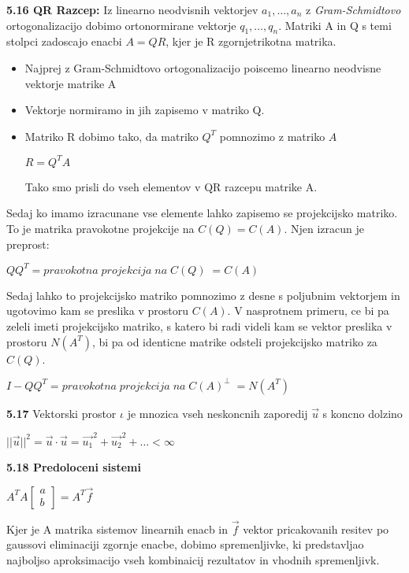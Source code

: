 \documentclass{article}
\begin{document}
\begin{multicols}{4}
	\textbf{5.16 QR Razcep:} Iz linearno neodvisnih vektorjev $a_{1}, \dots, a_{n}$ z \textit{Gram-Schmidtovo} ortogonalizacijo
	dobimo ortonormirane vektorje $q_{1}, \dots, q_{n}$. Matriki A in Q s temi stolpci zadoscajo enacbi $A = QR$, kjer
	je R zgornjetrikotna matrika.
	\begin{itemize}
		\item Najprej z Gram-Schmidtovo ortogonalizacijo poiscemo linearno neodvisne vektorje matrike A
		\item Vektorje normiramo in jih zapisemo v matriko Q.
		\item Matriko R dobimo tako, da matriko $Q^{T}$ pomnozimo z matriko $A$
		      \begin{center}
			      \begin{math}
				      R = Q^{T}A
			      \end{math}
		      \end{center}
		      Tako smo prisli do vseh elementov v QR razcepu matrike A.
	\end{itemize}
	Sedaj ko imamo izracunane vse elemente lahko zapisemo se projekcijsko matriko. To je matrika pravokotne projekcije na $C(Q) = C(A)$.
	Njen izracun je preprost:
	\begin{center}
		\begin{math}
			QQ^{T} = pravokotna\; projekcija\; na\; C(Q)\; = C(A)
		\end{math}
	\end{center}
	Sedaj lahko to projekcijsko matriko pomnozimo z desne s poljubnim vektorjem in ugotovimo kam se preslika v prostoru $C(A)$.
	V nasprotnem primeru, ce bi pa zeleli imeti projekcijsko matriko, s katero bi radi videli kam se vektor preslika v prostoru $N(A^{T})$, bi pa od identicne matrike
	odsteli projekcijsko matriko za $C(Q)$.
	\begin{center}
		\begin{math}
			I - QQ^{T} = pravokotna\; projekcija\; na\; C(A)^{\perp}\; = N(A^{T})
		\end{math}
	\end{center}

	\textbf{5.17} Vektorski prostor $\iota$ je mnozica vseh neskoncnih zaporedij $\vec{u}$ s koncno
	dolzino
	\begin{center}
		$||\vec{u}||^{2} = \vec{u} \cdot \vec{u} = \vec{u_{1}}^{2} + \vec{u_{2}}^{2} + \dots < \infty$
	\end{center}

	\textbf{5.18 Predoloceni sistemi}
	\begin{center}
		\begin{math}
			A^{T}A
			\begin{bmatrix}
				a \\
				b
			\end{bmatrix}
			= A^{T}\vec{f}
		\end{math}
	\end{center}
	Kjer je A matrika sistemov linearnih enacb in $\vec{f}$ vektor pricakovanih resitev
	po gaussovi eliminaciji zgornje enacbe, dobimo spremenljivke, ki predstavljao najboljso aproksimacijo vseh kombinaicij rezultatov in vhodnih spremenljivk.


\end{multicols}
\end{document}
